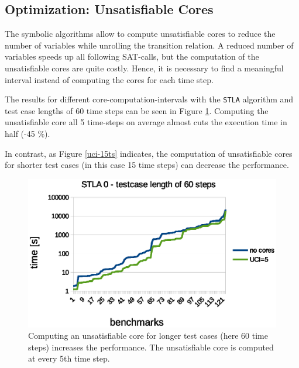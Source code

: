 \documentclass[a4paper,10pt]{article}
\begin{document}
\subsection{Optimization: Unsatisfiable Cores}
The symbolic algorithms allow to compute unsatisfiable cores to reduce the number of variables while unrolling the transition relation. A reduced number of variables speeds up all following SAT-calls,
but the computation of the unsatisfiable cores are quite costly. Hence, it is necessary to find a meaningful interval instead of computing the cores for each time step.

The results for different core-computation-intervals with the \texttt{STLA} algorithm and test case lengths of 60 time steps can be seen in Figure \ref{uci-30ts}. Computing the unsatisfiable core all 5 time-steps on average almost cuts
the execution time in half (-45 \%).

In contrast, as Figure \ref{uci-15ts} indicates, the computation of unsatisfiable cores for shorter test cases (in this case 15 time steps) can decrease the performance.

\begin{figure}[!htb]
\centering
\includegraphics[scale = 0.64]{img/uci-60ts.eps}
\centering \caption{Computing an unsatisfiable core for longer test cases (here 60 time steps) increases the performance. The unsatisfiable core is computed at every 5th time step.} 
\label{uci-30ts}
\end{figure}
\end{document}
